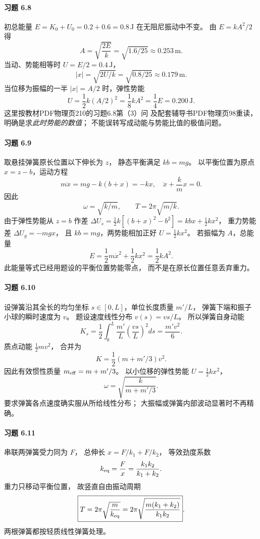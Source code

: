 \paragraph{习题 6.8}
初总能量
\(E=K_0+U_0=0.2+0.6=0.8\,\mathrm J\)
在无阻尼振动中不变。
由 \(E=kA^2/2\) 得
\[
 \boxed{A=\sqrt{\frac{2E}{k}}
 =\sqrt{1.6/25}\approx0.253\,\mathrm m}.
\]
当动、势能相等时
\(U=E/2=0.4\,\mathrm J\)，
\[
 \boxed{|x|=\sqrt{2U/k}
 =\sqrt{0.8/25}\approx0.179\,\mathrm m}.
\]
当位移为振幅的一半
\(|x|=A/2\) 时，弹性势能
\[
 \boxed{U=\frac12k(A/2)^2
 =\frac18kA^2=\frac14E=0.200\,\mathrm J}.
\]
这里按教材PDF物理页210的习题6.8第（3）问
及配套辅导书PDF物理页98重读，
明确是求\emph{此时势能的数值}；
不能误转写成动能与势能比值的极值问题。

\paragraph{习题 6.9}
取悬挂弹簧原长位置以下伸长为 \(z\)，
静态平衡满足 \(kb=mg\)。
以平衡位置为原点
\(x=z-b\)，运动方程
\[
 m\ddot x=mg-k(b+x)=-kx,
\quad
 \boxed{\ddot x+\frac{k}{m}x=0}.
\]
因此
\[
 \boxed{\omega=\sqrt{k/m}},\qquad
 \boxed{T=2\pi\sqrt{m/k}}.
\]
由于弹性势能从 \(z=b\) 作差
\(\Delta U_s=\frac12k[(b+x)^2-b^2]
 =kbx+\frac12kx^2\)，
重力势能差 \(\Delta U_g=-mgx\)，
且 \(kb=mg\)，两势能相加正好
\(U=\frac12kx^2\)。
若振幅为 \(A\)，总能量
\[
 \boxed{E=\frac12m\dot x^2+\frac12kx^2
 =\frac12kA^2}.
\]
此能量等式已经用题设的平衡位置势能零点，
而不是在原长位置任意丢弃重力。

\paragraph{习题 6.10}
设弹簧沿其全长的均匀坐标
\(s\in[0,L]\)，单位长度质量 \(m'/L\)，
弹簧下端和振子小球的瞬时速度为 \(v\)。
题设速度线性分布
\(v(s)=vs/L\)。
所以弹簧自身动能
\[
 K_s=\frac12\int_0^L
 \frac{m'}L\left(\frac{vs}L\right)^2ds
 =\frac{m'v^2}{6}.
\]
质点动能 \(\frac12mv^2\)，
合并为
\[
 \boxed{K=\frac12(m+m'/3)v^2}.
\]
因此有效惯性质量
\(m_{\rm eff}=m+m'/3\)。
以小位移的弹性势能
\(U=\frac12kx^2\)，
\[
 \boxed{\omega=\sqrt{\frac{k}{m+m'/3}}}.
\]
要求弹簧各点速度确实服从所给线性分布；
大振幅或弹簧内部波动显著时不再精确。

\paragraph{习题 6.11}
串联两弹簧受力同为 \(F\)，
总伸长
\(x=F/k_1+F/k_2\)，
等效劲度系数
\[
 k_{\rm eq}=\frac{F}{x}
 =\frac{k_1k_2}{k_1+k_2}.
\]
重力只移动平衡位置，
故竖直自由振动周期
\[
 \boxed{T=2\pi\sqrt{\frac m{k_{\rm eq}}}
 =2\pi\sqrt{\frac{m(k_1+k_2)}{k_1k_2}}}.
\]
两根弹簧都按轻质线性弹簧处理。

